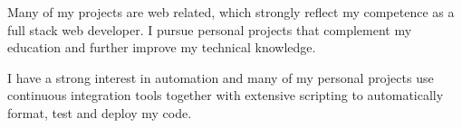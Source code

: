 
Many of my projects are web related, which strongly reflect my competence as a full stack web developer. I pursue personal projects that complement my education and further improve my technical knowledge.

\hfill\break

I have a strong interest in automation and many of my personal projects use continuous integration tools together with extensive scripting to automatically format, test and deploy my code.
